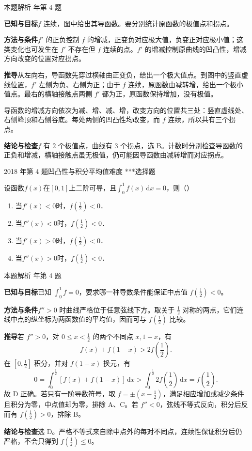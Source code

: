 \documentclass[UTF8,zihao=-4,fontset=fandol]{ctexart}
\newcommand{\pickout}{\hfill（\hspace{1.4em}）}
\newenvironment{abcd}{\begin{enumerate}[label=\textup{(\Alph*)},leftmargin=2.3em,itemsep=1pt,topsep=4pt,parsep=1pt]}{\end{enumerate}}
\newcounter{BankQuestion}
\newcommand{\QuestionPage}[7]{%
  \stepcounter{BankQuestion}%
  \par\noindent\begin{minipage}{\linewidth}
  \raggedright
  {\small\textcolor{black!60}{#3\quad #5\quad 难度 #7}\hfill\textcolor{accent}{#2}}\par\smallskip}
\newcommand{\QuestionEnd}{\end{minipage}\par\medskip}
\newcommand{\QuestionPage}[7]{%
  \clearpage
  \stepcounter{BankQuestion}%
  {\small\textcolor{accent}{#1\hfill #2}}\par\medskip
  {\small\textcolor{black!60}{#3\quad #5\quad 难度 #7\hfill \arabic{BankQuestion} / 234}}\par\vspace{9bp}}
\newcommand{\QuestionEnd}{}
\newenvironment{QuestionSolution}[1]{%
  \clearpage
  {\small\textcolor{black!60}{本题解析\quad #1}}\par\medskip
}{\par\clearpage}
\begin{document}
\begin{QuestionSolution}{2016 年第 4 题}
\textbf{已知与目标}\quad \(f\) 连续，图中给出其导函数。要分别统计原函数的极值点和拐点。

\textbf{方法与条件}\quad \(f'\) 的正负控制 \(f\) 的增减，正变负对应极大值，负变正对应极小值；这类变化也可发生在 \(f'\) 不存在但 \(f\) 连续的点。\(f'\) 的增减控制原曲线的凹凸性，增减方向改变的位置对应拐点。

\textbf{推导}\quad 从左向右，导函数先穿过横轴由正变负，给出一个极大值点。到图中的竖直虚线位置，\(f'\) 左侧为负、右侧为正；由于 \(f\) 连续，原函数由减转增，给出一个极小值点。最右的横轴接触点两侧 \(f'\) 都为正，原函数保持增加，没有极值。

导函数的增减方向依次为减、增、减、增，改变方向的位置共三处：竖直虚线处、右侧峰顶和右侧谷底。每处两侧的凹凸性均改变，而 \(f\) 连续，所以共有三个拐点。

\textbf{结论与检查}\quad \(f\) 有 \(\boxed{2}\) 个极值点，曲线有 \(\boxed{3}\) 个拐点，选 B。计数时分别检查导函数的正负和增减，横轴接触点虽无极值，仍可能因导函数由减转增而对应拐点。
\end{QuestionSolution}

\QuestionPage{2.6 函数性态的研究}{选择题}{2018 年第 4 题}{1}{凹凸性与积分平均值}{109 / 234}{***}
设函数$f(x)$在$[0,1]$上二阶可导，且$\int_0^1 f(x)\,\mathrm{d} x = 0$，则\pickout{}
\begin{abcd}
\item 当$f'(x) < 0$时，$f\left(\frac{1}{2} \right) < 0$．
\item 当$f''(x) < 0$时，$f\left(\frac{1}{2} \right) < 0$．
\item 当$f'(x) > 0$时，$f\left(\frac{1}{2} \right) < 0$．
\item 当$f''(x) > 0$时，$f\left(\frac{1}{2} \right) < 0$．
\end{abcd}
\QuestionEnd

\begin{QuestionSolution}{2018 年第 4 题}
\textbf{已知与目标}\quad 已知 \(\int_0^1 f=0\)，要求哪一种导数条件能保证中点值 \(f(\frac12)<0\)。

\textbf{方法与条件}\quad \(f''>0\) 时曲线严格位于任意弦线下方。取关于 \(\frac12\) 对称的两点，它们连线中点的纵坐标为两函数值的平均值，因而可与 \(f(\frac12)\) 比较。

\textbf{推导}\quad 若 \(f''>0\)，对 \(0\le x<\frac12\) 的两个不同点 \(x,1-x\)，有
\[
f(x)+f(1-x)>2f(\frac{1}{2}).
\]
在 \([0,\frac12]\) 积分，并对 \(f(1-x)\) 换元，有
\[0=\int_0^{\frac12}[f(x)+f(1-x)]\,\mathrm dx>\int_0^{\frac12}2f(\frac12)\,\mathrm dx=f(\frac12).\]
故 D 正确。若只有一阶导数符号，取 \(f=\pm(x-\frac12)\)，满足相应增加或减少条件且积分为零，中点值却为零，排除 A、C。若 \(f''<0\)，弦线不等式反向，积分后反而有 \(f(\frac12)>0\)，排除 B。

\textbf{结论与检查}\quad 选 \(\boxed{\mathrm D}\)。严格不等式来自除中点外的每对不同点，连续性保证积分后仍严格，不会只得到 \(f(\frac12)\le0\)。
\end{QuestionSolution}
\end{document}
